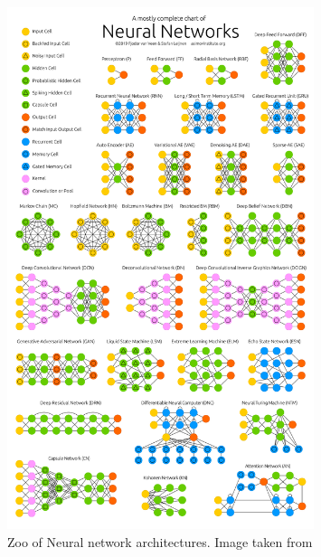 			\begin{figure}
				\includegraphics[width=0.8\textwidth]{./images/NeuralNetworkZoo.png}
				\caption{Zoo of Neural network architectures. Image taken from }
				\label{Fig:NNZoo}
			\end{figure}

